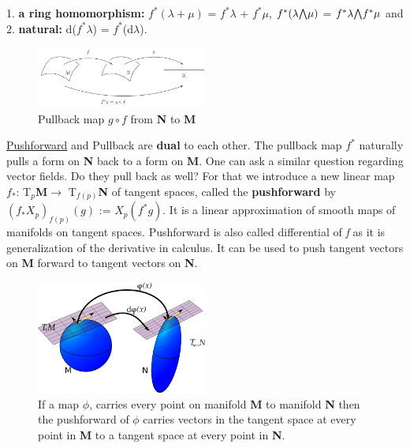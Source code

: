 1. \textbf{a ring homomorphism: } $f^*(\lambda + \mu)$ = $f^*\lambda$ + $f^*\mu$, $f^*(\lambda \exterior \mu)$ = $f^*\lambda \exterior f^*\mu$ and \\
2. \textbf{natural: } d($f^*\lambda$) = $f^*$(d$\lambda$).

\begin{figure}[ht]
    \begin{center}
        \includegraphics[width=0.5\textwidth]{figures/pullback.png}
        \caption{Pullback map $g\circ f$ from \textbf{N} to \textbf{M}}
    \end{center}
\end{figure}

\href{https://en.wikipedia.org/wiki/Pushforward_(differential)}{Pushforward} and Pullback are \textbf{dual} to each other. 
The pullback map $f^*$ naturally pulls a form on \textbf{N} back to a form on \textbf{M}. 
One can ask a similar question regarding vector fields. Do they pull back as well? For that we introduce a new linear map $f_*$: T$_p$\textbf{M}$\rightarrow$
T$_{f(p)}$\textbf{N} of tangent spaces, called the \textbf{pushforward} by $(f_*X_p)_{f(p)}(g)$ := $X_p(f^*g)$.
It is a linear approximation of smooth maps of manifolds on tangent spaces. Pushforward is also called differential of \textit{f} as it is generalization of the derivative in calculus.
It can be used to push tangent vectors on \textbf{M} forward to tangent vectors on \textbf{N}.

\begin{figure}[ht]
    \begin{center}
        \includegraphics[width=0.5\textwidth]{figures/Pushforward.png}
        \caption{If a map $\phi$, carries every point on manifold \textbf{M} to manifold \textbf{N} then 
        the pushforward of $\phi$ carries vectors in the tangent space at every point in \textbf{M} to a tangent space at every point in \textbf{N}.}
    \end{center}
\end{figure}

